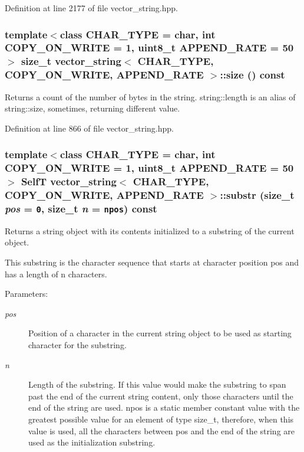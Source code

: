 Definition at line 2177 of file vector\_\-string.hpp.\hypertarget{classvector__string_04d1b575101326449857d05ac08b0f79}{
\subsubsection[{size}]{\setlength{\rightskip}{0pt plus 5cm}template$<$class CHAR\_\-TYPE  = char, int COPY\_\-ON\_\-WRITE = 1, uint8\_\-t APPEND\_\-RATE = 50$>$ size\_\-t {\bf vector\_\-string}$<$ CHAR\_\-TYPE, COPY\_\-ON\_\-WRITE, APPEND\_\-RATE $>$::size () const}}
\label{classvector__string_04d1b575101326449857d05ac08b0f79}


Returns a count of the number of bytes in the string. string::length is an alias of string::size, sometimes, returning different value. 

Definition at line 866 of file vector\_\-string.hpp.\hypertarget{classvector__string_0d46d44039a39232b4c3611920a43653}{
\subsubsection[{substr}]{\setlength{\rightskip}{0pt plus 5cm}template$<$class CHAR\_\-TYPE  = char, int COPY\_\-ON\_\-WRITE = 1, uint8\_\-t APPEND\_\-RATE = 50$>$ {\bf SelfT} {\bf vector\_\-string}$<$ CHAR\_\-TYPE, COPY\_\-ON\_\-WRITE, APPEND\_\-RATE $>$::substr (size\_\-t {\em pos} = {\tt 0}, \/  size\_\-t {\em n} = {\tt {\bf npos}}) const}}
\label{classvector__string_0d46d44039a39232b4c3611920a43653}


Returns a string object with its contents initialized to a substring of the current object.

This substring is the character sequence that starts at character position pos and has a length of n characters.

\begin{Desc}
\item[Parameters:]
\begin{description}
\item[{\em pos}]Position of a character in the current string object to be used as starting character for the substring. \item[{\em n}]Length of the substring. If this value would make the substring to span past the end of the current string content, only those characters until the end of the string are used. npos is a static member constant value with the greatest possible value for an element of type size\_\-t, therefore, when this value is used, all the characters between pos and the end of the string are used as the initialization substring. \end{description}
\end{Desc}


